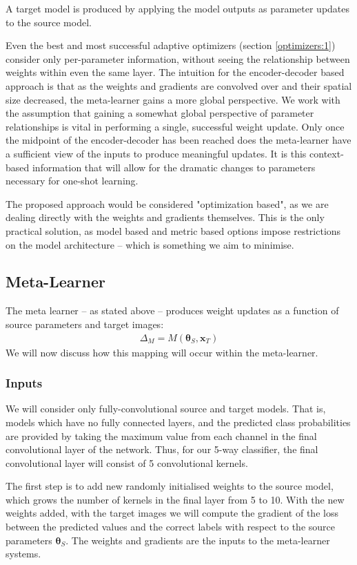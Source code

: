 \documentclass{report}
\begin{document}
	A target model is produced by applying the model outputs as parameter updates to the source model. \par
	Even the best and most successful adaptive optimizers (section \ref{optimizers:1}) consider only per-parameter information, without seeing the relationship between weights within even the same layer. The intuition for the encoder-decoder based approach is that as the weights and gradients are convolved over and their spatial size decreased, the meta-learner gains a more global perspective. We work with the assumption that gaining a somewhat global perspective of parameter relationships is vital in performing a single, successful weight update. Only once the midpoint of the encoder-decoder has been reached does the meta-learner have a sufficient view of the inputs to produce meaningful updates. It is this context-based information that will allow for the dramatic changes to parameters necessary for one-shot learning. \par
	The proposed approach would be considered "optimization based", as we are dealing directly with the weights and gradients themselves. This is the only practical solution, as model based and metric based options impose restrictions on the model architecture -- which is something we aim to minimise. \par
	
	\subsection{Meta-Learner}
	The meta learner -- as stated above -- produces weight updates as a function of source parameters and target images:
	\begin{align}
	\Delta_M = M(\bm{\theta}_S, \bm{x}_T)
	\end{align}
	We will now discuss how this mapping will occur within the meta-learner.

	\subsubsection{Inputs}
	We will consider only fully-convolutional source and target models. That is, models which have no fully connected layers, and the predicted class probabilities are provided by taking the maximum value from each channel in the final convolutional layer of the network. Thus, for our 5-way classifier, the final convolutional layer will consist of 5 convolutional kernels. \par
	The first step is to add new randomly initialised weights to the source model, which grows the number of kernels in the final layer from 5 to 10. With the new weights added, with the target images we will compute the gradient of the loss between the predicted values and the correct labels with respect to the source parameters $\bm{\theta}_S$. The weights and gradients are the inputs to the meta-learner systems. \par
	
\end{document}
